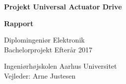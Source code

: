 \documentclass[11pt, a4paper, twoside, openany]{memoir}
\date{}
\author{\forfatter}
\title{\titel}
\begin{document}
\begin{titlingpage}
		
		\begin{center}
				{\huge\bfseries Projekt Universal Actuator Drive}\\
				\vspace{10pt}
				
				{\Huge\bfseries Rapport}\\
				
				\vspace{20pt}
				
				{Diplomingeniør Elektronik}\\
				{\large Bachelorprojekt Efterår 2017}\\
				
				\vspace{10pt}
				
				Ingeniørhøjskolen Aarhus Universitet\\
				Vejleder: Arne Justesen
				\vspace{10pt}
				

\end{center}
\end{titlingpage}
\end{document}
